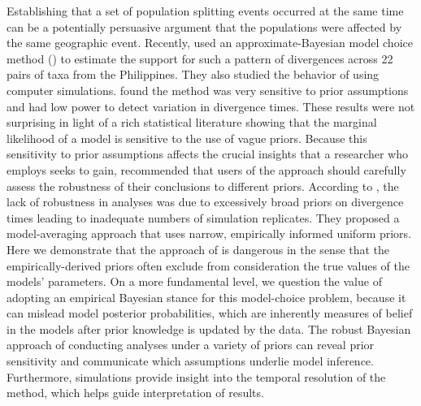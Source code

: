 Establishing that a set of population splitting events occurred at the same
time can be a potentially persuasive argument that the populations were
affected by the same geographic event.
Recently, \citet{Oaks2012} used an approximate-Bayesian model choice method
(\msb) to estimate the support for such a pattern of divergences across 22
pairs of taxa from the Philippines.
They also studied the behavior of \msb using computer simulations.
\citet{Oaks2012} found the method was very sensitive to prior assumptions and
had low power to detect variation in divergence times.
These results were not surprising in light of a rich statistical literature
showing that the marginal likelihood of a model is sensitive to the
use of vague priors.
Because this sensitivity to prior assumptions affects the crucial insights 
that a researcher who employs \msb seeks to gain, \citet{Oaks2012} recommended
that users of the approach should carefully assess the robustness of their 
conclusions to different priors.
According to \citet{Hickerson2013}, the lack of robustness in \msb analyses
was due to excessively broad priors on divergence times leading to 
inadequate numbers of simulation replicates.
They proposed a model-averaging approach that uses narrow, empirically
informed uniform priors.
Here we demonstrate that the approach of \citet{Hickerson2013} is
dangerous in the sense that the empirically-derived priors often
exclude from consideration the true values of the models' parameters.
On a more fundamental level, we question the value of adopting an empirical
Bayesian stance for this model-choice problem, because it can mislead model
posterior probabilities, which are inherently measures of belief in the
models after prior knowledge is updated by the data.
The robust Bayesian approach of conducting analyses under a variety
of priors can reveal prior sensitivity and communicate which assumptions
underlie model inference.
Furthermore, simulations provide insight into the temporal resolution of the
method, which helps guide interpretation of results.
